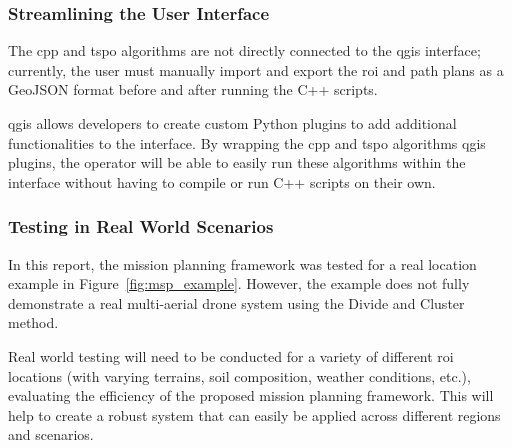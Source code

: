 \subsubsection{Streamlining the User Interface}

The \gls{cpp} and \gls{tspo} algorithms are not directly connected to the \gls{qgis} interface; currently, the user must manually import and export the \gls{roi} and path plans as a GeoJSON format before and after running the C++ scripts. 

\gls{qgis} allows developers to create custom Python plugins to add additional functionalities to the interface. By wrapping the \gls{cpp} and \gls{tspo} algorithms \gls{qgis} plugins, the operator will be able to easily run these algorithms within the interface without having to compile or run C++ scripts on their own. 

\subsubsection{Testing in Real World Scenarios}

In this report, the mission planning framework was tested for a real location example in Figure~\ref{fig:msp_example}. However, the example does not fully demonstrate a real multi-aerial drone system using the Divide and Cluster method.

Real world testing will need to be conducted for a variety of different \gls{roi} locations (with varying terrains, soil composition, weather conditions, etc.), evaluating the efficiency of the proposed mission planning framework. This will help to create a robust system that can easily be applied across different regions and scenarios. 